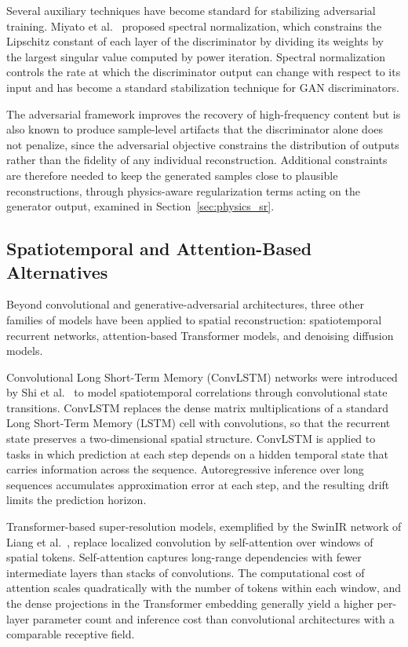 Several auxiliary techniques have become standard for stabilizing adversarial training. Miyato et al.~\cite{miyato2018spectral} proposed spectral normalization, which constrains the Lipschitz constant of each layer of the discriminator by dividing its weights by the largest singular value computed by power iteration. Spectral normalization controls the rate at which the discriminator output can change with respect to its input and has become a standard stabilization technique for GAN discriminators.

The adversarial framework improves the recovery of high-frequency content but is also known to produce sample-level artifacts that the discriminator alone does not penalize, since the adversarial objective constrains the distribution of outputs rather than the fidelity of any individual reconstruction. Additional constraints are therefore needed to keep the generated samples close to plausible reconstructions, through physics-aware regularization terms acting on the generator output, examined in Section~\ref{sec:physics_sr}.


\subsection{Spatiotemporal and Attention-Based Alternatives}
\label{subsec:modern_frontier}

Beyond convolutional and generative-adversarial architectures, three other families of models have been applied to spatial reconstruction: spatiotemporal recurrent networks, attention-based Transformer models, and denoising diffusion models.

Convolutional Long Short-Term Memory (ConvLSTM) networks were introduced by Shi et al.~\cite{shi2015convolutional} to model spatiotemporal correlations through convolutional state transitions. ConvLSTM replaces the dense matrix multiplications of a standard Long Short-Term Memory (LSTM) cell with convolutions, so that the recurrent state preserves a two-dimensional spatial structure. ConvLSTM is applied to tasks in which prediction at each step depends on a hidden temporal state that carries information across the sequence. Autoregressive inference over long sequences accumulates approximation error at each step, and the resulting drift limits the prediction horizon.

Transformer-based super-resolution models, exemplified by the SwinIR network of Liang et al.~\cite{liang2021swinir}, replace localized convolution by self-attention over windows of spatial tokens. Self-attention captures long-range dependencies with fewer intermediate layers than stacks of convolutions. The computational cost of attention scales quadratically with the number of tokens within each window, and the dense projections in the Transformer embedding generally yield a higher per-layer parameter count and inference cost than convolutional architectures with a comparable receptive field.

